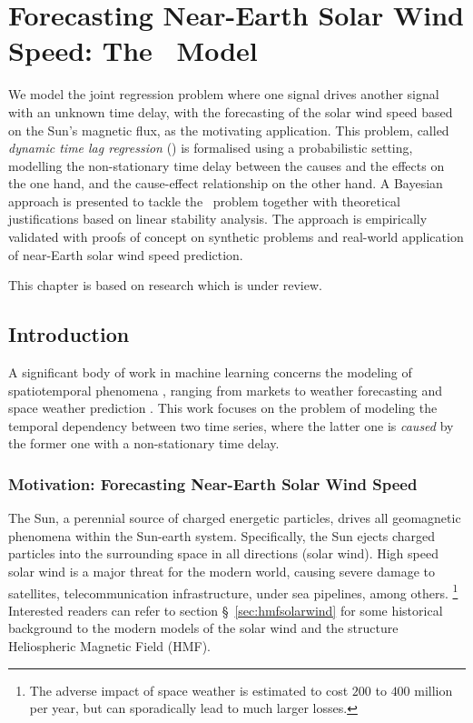 \chapter{Forecasting Near-Earth Solar Wind Speed: The \XX \ Model}\label{chapter:pdt}

{\small
  We model the joint regression problem where one signal drives another signal with an unknown 
  time delay, with the forecasting of the solar wind speed based on the Sun's magnetic flux, as the 
  motivating application. This problem, called \emph{dynamic time lag regression} (\XX) is 
  formalised using a probabilistic setting, modelling the non-stationary time delay between the 
  causes and the effects on the one hand, and the cause-effect relationship on the other hand. A 
  Bayesian approach is presented to tackle the \XX\ problem together with theoretical 
  justifications based on linear stability analysis. The approach is empirically validated with 
  proofs of concept on synthetic problems and real-world application of near-Earth solar wind speed 
  prediction. 
}


\vfill
{}
\vfill

\noindent
    \parbox{\textwidth}{%
        {\small This chapter is based on research which is under review.}
    }%


\clearpage


\section{Introduction}\label{sec:intro}
A significant body of work in machine learning concerns the modeling of spatiotemporal phenomena 
\citep{SurveyST,NIPSForecasting18}, ranging from markets \citep{Pedreschi} to weather forecasting 
\citep{Horvitz} and space weather prediction \citep{EnricoLorentz,camporeale2018machine,EnricoArxiv}. 
This work focuses on the problem of modeling the temporal dependency between two time series, where 
the latter one is {\em caused} by the former one \citep{Granger} with a non-stationary time delay. 


\subsection{Motivation: Forecasting Near-Earth Solar Wind Speed}\label{sec:motivationsolarwind}
The Sun, a perennial source of charged energetic particles, drives all geomagnetic phenomena within 
the Sun-earth system. Specifically, the Sun ejects charged particles into the surrounding space in 
all directions (solar wind). High speed solar wind is a major threat for the modern world, causing 
severe damage to satellites, telecommunication infrastructure, under sea pipelines, among others. 
\footnote{The adverse impact of space weather is estimated to cost $200$ to $400$ million per year, 
but can sporadically lead to much larger losses.} Interested readers can refer to section 
\S~\ref{sec:hmfsolarwind} for some historical background to the modern models of the solar wind and 
the structure Heliospheric Magnetic Field (HMF). 

